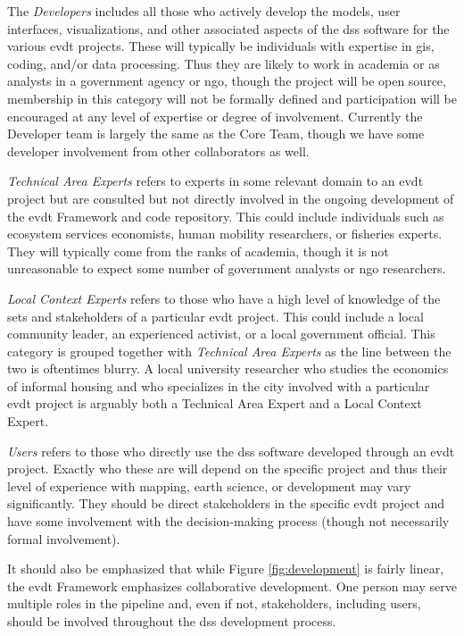 \documentclass[notitlepage]{article}
\begin{document}
The \textit{Developers} includes all those who actively develop the models, user interfaces, visualizations, and other associated aspects of the \ac{dss} software for the various \ac{evdt} projects. These will typically be individuals with expertise in \ac{gis}, coding, and/or data processing. Thus they are likely to work in academia or as analysts in a government agency or \ac{ngo}, though the project will be open source, membership in this category will not be formally defined and participation will be encouraged at any level of expertise or degree of involvement. Currently the Developer team is largely the same as the Core Team, though we have some developer involvement from other collaborators as well.

\textit{Technical Area Experts} refers to experts in some relevant domain to an \ac{evdt} project but are consulted but not directly involved in the ongoing development of the \ac{evdt} Framework and code repository. This could include individuals such as ecosystem services economists, human mobility researchers, or fisheries experts. They will typically come from the ranks of academia, though it is not unreasonable to expect some number of government analysts or \ac{ngo} researchers.

\textit{Local Context Experts} refers to those who have a high level of knowledge of the \ac{sets} and stakeholders of a particular \ac{evdt} project. This could include a local community leader, an experienced activist, or a local government official. This category is grouped together with \textit{Technical Area Experts} as the line between the two is oftentimes blurry. A local university researcher who studies the economics of informal housing and who specializes in the city involved with a particular \ac{evdt} project is arguably both a Technical Area Expert and a Local Context Expert.

\textit{Users} refers to those who directly use the \ac{dss} software developed through an \ac{evdt} project. Exactly who these are will depend on the specific project and thus their level of experience with mapping, earth science, or development may vary significantly. They should be direct stakeholders in the specific \ac{evdt} project and have some involvement with the decision-making process (though not necessarily formal involvement). 

It should also be emphasized that while Figure \ref{fig:development} is fairly linear, the \ac{evdt} Framework emphasizes collaborative development. One person may serve multiple roles in the pipeline and, even if not, stakeholders, including users, should be involved throughout the \ac{dss} development process.
\end{document}
